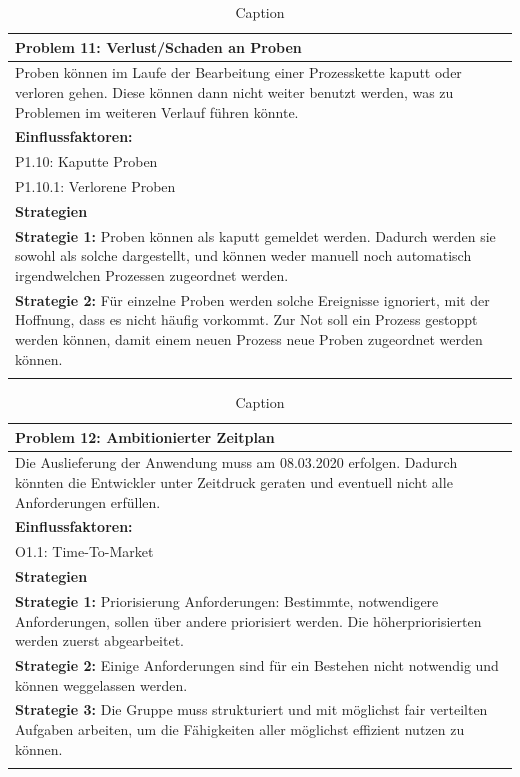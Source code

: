 \documentclass[enabledeprecatedfontcommands,fontsize=12pt,paper=a4,twoside]{scrartcl}
\begin{document}
\begin{table}[]
    \centering
    \begin{tabular}{|p{15cm}|}
    \hline
          \textbf{Problem 11:} Verlust/Schaden an Proben
          \\ \hline
          Proben können im Laufe der Bearbeitung einer Prozesskette kaputt oder verloren gehen. Diese können dann nicht weiter benutzt werden, was zu Problemen im weiteren Verlauf führen könnte.
          \\ \hline
          \textbf{Einflussfaktoren: } \\
          P1.10: Kaputte Proben\\
          P1.10.1: Verlorene Proben \\
          \hline
          \textbf{Strategien} \\ \hline
          \textbf{Strategie 1:} Proben können als kaputt gemeldet werden. Dadurch werden sie sowohl als solche dargestellt, und können weder manuell noch automatisch irgendwelchen Prozessen zugeordnet werden. \\
          \textbf{Strategie 2:} Für einzelne Proben werden solche Ereignisse ignoriert, mit der Hoffnung, dass es nicht häufig vorkommt. Zur Not soll ein Prozess gestoppt werden können, damit einem neuen Prozess neue Proben zugeordnet werden können. \\
          \\ \hline
    \end{tabular}
    \caption{Caption}
    \label{tab:my_label}
\end{table}

\begin{table}[]
    \centering
    \begin{tabular}{|p{15cm}|}
    \hline
          \textbf{Problem 12:} Ambitionierter Zeitplan
          \\ \hline
          Die Auslieferung der Anwendung muss am 08.03.2020 erfolgen. Dadurch könnten die Entwickler unter Zeitdruck geraten und eventuell nicht alle Anforderungen erfüllen.
          \\ \hline
          \textbf{Einflussfaktoren: } \\
          O1.1: Time-To-Market\\
          \hline
          \textbf{Strategien} \\ \hline
          \textbf{Strategie 1:} Priorisierung Anforderungen: Bestimmte, notwendigere Anforderungen, sollen über andere priorisiert werden. Die höherpriorisierten werden zuerst abgearbeitet. \\
          \textbf{Strategie 2:} Einige Anforderungen sind für ein Bestehen nicht notwendig und können weggelassen werden.\\
          \textbf{Strategie 3:} Die Gruppe muss strukturiert und mit möglichst fair verteilten Aufgaben arbeiten, um die Fähigkeiten aller möglichst effizient nutzen zu können. \\
          \\ \hline
    \end{tabular}
    \caption{Caption}
    \label{tab:my_label}
\end{table}
\end{document}
